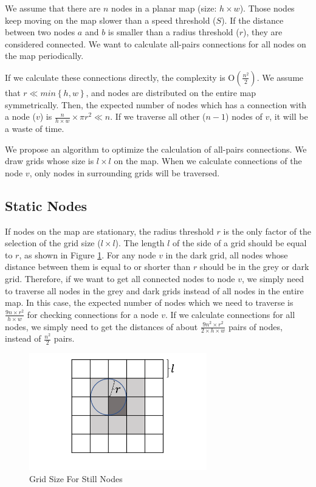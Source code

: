 \noindent We assume that there are $n$ nodes in a planar map (size: $h\times w$). Those nodes keep moving on the map slower than a speed threshold ($S$). If the distance between two nodes $a$ and $b$ is smaller than a radius threshold ($r$), they are considered connected. We want to calculate all-pairs connections for all nodes on the map periodically. 

If we calculate these connections directly, the complexity is $\mathrm{O}\left(\frac{n^2}{2}\right)$. We assume that $r\ll min\left\{h,w\right\}$, and nodes are distributed on the entire map symmetrically. Then, the expected number of nodes which has a connection with a node ($v$) is $\frac{n}{h\times w}\times\pi r^2\ll n$. If we traverse all other ($n-1$) nodes of $v$, it will be a waste of time.

We propose an algorithm to optimize the calculation of all-pairs connections. We draw grids whose size is $l\times l$ on the map. When we calculate connections of the node $v$, only nodes in surrounding grids will be traversed.


\subsection{ Static Nodes}

\noindent If nodes on the map are stationary, the radius threshold $r$ is the only factor of the selection of the grid size ($l\times l$). The length $l$ of the side of a grid should be equal to $r$, as shown in Figure \ref{fig:F53GridSizeForStillNodes}. For any node $v$ in the dark grid, all nodes whose distance between them is equal to or shorter than $r$ should be in the grey or dark grid. Therefore, if we want to get all connected nodes to node $v$, we simply need to traverse all nodes in the grey and dark grids instead of all nodes in the entire map. In this case, the expected number of nodes which we need to traverse is $\frac{9n\times r^2}{h\times w}$ for checking connections for a node $v$. If we calculate connections for all nodes, we simply need to get the distances of about $\frac{9n^2\times r^2}{2\times h\times w}$ pairs of nodes, instead of $\frac{n^2}{2}$ pairs.

\begin{figure} [hbtp]
  \centering 
  \includegraphics[height=2in]{figures/F53GridSizeForStillNodes.png}
  \caption{Grid Size For Still Nodes} 
  \label{fig:F53GridSizeForStillNodes} %
\end{figure}


